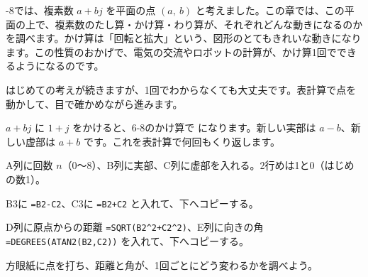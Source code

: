 -8では、複素数 $a+bj$ を平面の点 $(a,\ b)$ と考えました。この章では、この平面の上で、複素数のたし算・かけ算・わり算が、それぞれどんな動きになるのかを調べます。かけ算は「回転と拡大」という、図形のとてもきれいな動きになります。この性質のおかげで、電気の交流やロボットの計算が、かけ算1回でできるようになるのです。

はじめての考えが続きますが、1回でわからなくても大丈夫です。表計算で点を動かして、目で確かめながら進みます。%

\begin{yattemiyou}
$a+bj$ に $1+j$ をかけると、6-8のかけ算で
になります。新しい実部は $a-b$、新しい虚部は $a+b$ です。これを表計算で何回もくり返します。
\begin{enumerate}[label={\bkcircled[bkGreen]{\arabic*}}, leftmargin=2.4\zw, itemsep=1pt, topsep=3pt]
\item A列に回数 $n$（0〜8）、B列に実部、C列に虚部を入れる。2行めは1と0（はじめの数1）。
\item B3に \texttt{=B2-C2}、C3に \texttt{=B2+C2} と入れて、下へコピーする。
\item D列に原点からの距離 \texttt{=SQRT(B2\^{}2+C2\^{}2)}、E列に向きの角 \texttt{=DEGREES(ATAN2(B2,C2))} を入れて、下へコピーする。
\item 方眼紙に点を打ち、距離と角が、1回ごとにどう変わるかを調べよう。
\end{enumerate}
\begin{bkcenter}
\end{bkcenter}
\end{yattemiyou}

\begin{bkcenter}
\end{bkcenter}


